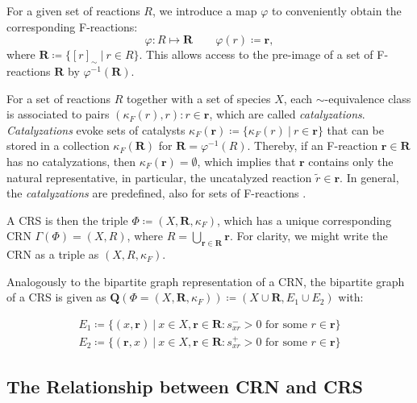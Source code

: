\documentclass[pdflatex]{sn-jnl}
\theoremstyle{thmstyleone}%
\theoremstyle{examplesty}%
\theoremstyle{thmstylethree}%
\newcommand{\queen}{\mathbf{Q}}
\newcommand{\CR}[0]{R}
\newcommand{\FR}[0]{\mathbf{R}}
\newcommand{\fr}[0]{\mathbf{r}}
\newcommand{\cat}{\kappa_F}
\newcommand{\PFS}[1]{\begingroup\color{cyan}#1\endgroup}
\newcommand{\holy}[1]{\begingroup\color{royalpurple}#1\endgroup}
\begin{document}
\PFS{For a given set of reactions $R$, we introduce a map $\varphi$ to conveniently obtain the corresponding F-reactions:}
\begin{equation}
  \varphi: R\mapsto \FR\quad\quad \varphi(r) \coloneqq \fr, 
\end{equation}
where $\FR\coloneqq \{[r]_{\sim} \ | \ r\in R\}$. This allows access to the
pre-image of a set of F-reactions $\FR$ by $\varphi^{-1}(\FR)$.

\holy{For a set of reactions $R$ together with a set of species $X$, 
each $\sim$-equivalence class is associated to pairs $(\cat(r), r): r\in \fr$,
which are called \emph{catalyzations}. \emph{Catalyzations} evoke sets 
of catalysts $\cat(\fr)\coloneqq \{\cat(r) \ \vert \ r\in \fr\}$ that can be stored 
in a collection $\cat(\FR)$ for $\FR=\varphi^{-1}(R)$. Thereby, if an F-reaction 
$\fr\in \FR$ has no catalyzations, then $\cat(\fr)=\emptyset$, which implies 
that $\fr$ contains only the natural representative, in particular, the uncatalyzed 
reaction $\tilde{r}\in \fr$. In general, the \emph{catalyzations} are predefined, also 
for sets of F-reactions \cite{hordijk_detecting_2004}.}

 A CRS is then the triple $\Phi \coloneqq (X,\FR, \cat)$, which has a unique corresponding 
 CRN $\Gamma(\Phi) = (X, \CR)$, where $\CR=\bigcup_{\fr \in \FR}\fr$. For clarity, we might 
 write the CRN as a triple as $(X, \CR, \cat)$.

Analogously to the bipartite graph representation of a CRN, the bipartite
graph of a CRS is given as $\queen(\Phi=(X,\FR, \cat))\coloneqq (X \cup
\FR, E_1\cup E_2)$ with:

\begin{equation}
  \begin{split}
    E_1\coloneqq \{(x,\fr) \ | \ x\in X, \fr\in \FR: s^-_{xr}>0 \text{ for some } r \in \fr \} \\
    E_2\coloneqq \{(\fr, x) \ | \ x\in X, \fr\in \FR: s^+_{xr}>0 \text{ for some } r \in \fr \}
  \end{split}
\end{equation}

\subsection{The Relationship between CRN and CRS}
\label{ssect:CRNCRS}
\end{document}
